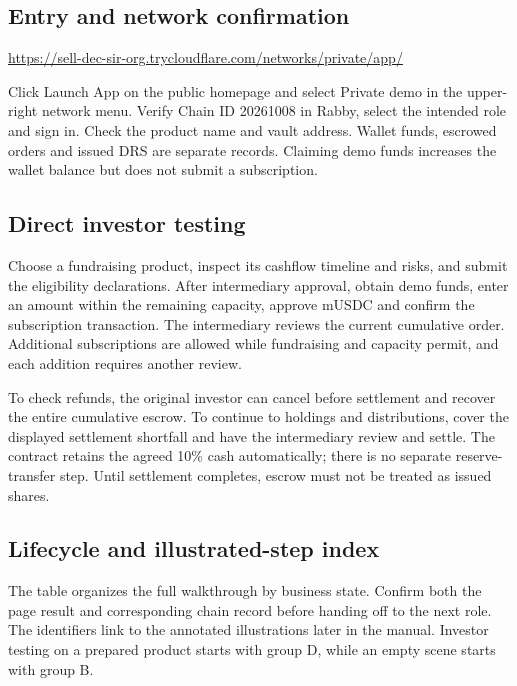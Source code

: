 \documentclass[12pt,a4paper]{article}
\begin{document}
\subsection{Entry and network confirmation}
\url{https://sell-dec-sir-org.trycloudflare.com/networks/private/app/}\par
Click Launch App on the public homepage and select Private demo in the upper-right network menu. Verify Chain ID 20261008 in Rabby, select the intended role and sign in. Check the product name and vault address. Wallet funds, escrowed orders and issued DRS are separate records. Claiming demo funds increases the wallet balance but does not submit a subscription.

\subsection{Direct investor testing}
Choose a fundraising product, inspect its cashflow timeline and risks, and submit the eligibility declarations. After intermediary approval, obtain demo funds, enter an amount within the remaining capacity, approve mUSDC and confirm the subscription transaction. The intermediary reviews the current cumulative order. Additional subscriptions are allowed while fundraising and capacity permit, and each addition requires another review.

To check refunds, the original investor can cancel before settlement and recover the entire cumulative escrow. To continue to holdings and distributions, cover the displayed settlement shortfall and have the intermediary review and settle. The contract retains the agreed 10\% cash automatically; there is no separate reserve-transfer step. Until settlement completes, escrow must not be treated as issued shares.

\clearpage
\subsection{Lifecycle and illustrated-step index}
The table organizes the full walkthrough by business state. Confirm both the page result and corresponding chain record before handing off to the next role. The identifiers link to the annotated illustrations later in the manual. Investor testing on a prepared product starts with group D, while an empty scene starts with group B.
\end{document}
